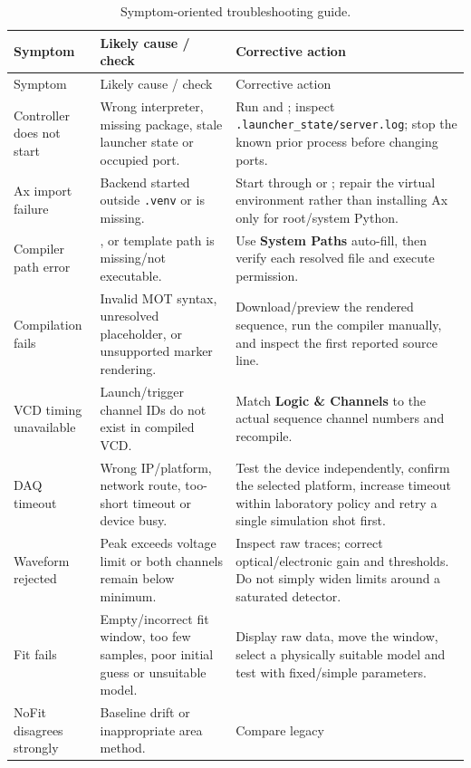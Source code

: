 \documentclass[11pt,oneside,openany]{book}
\newcommand{\code}[1]{\texttt{\detokenize{#1}}}
\newcommand{\ui}[1]{\textbf{#1}}
\newcommand{\pathcode}[1]{\nolinkurl{#1}}
\begin{document}
\small
\begin{longtable}{p{} p{} p{}}
\caption{Symptom-oriented troubleshooting guide.}\label{tab:trouble}\\
\toprule
Symptom & Likely cause / check & Corrective action\\
\midrule
\endfirsthead
\toprule Symptom & Likely cause / check & Corrective action\\ \midrule
\endhead
Controller does not start & Wrong interpreter, missing package, stale launcher state or
occupied port. & Run \code{--check-only} and \code{--status}; inspect
\pathcode{.launcher_state/server.log}; stop the known prior process before changing ports.\\
Ax import failure & Backend started outside \pathcode{.venv} or \code{ax-platform} is
missing. & Start through \code{launch_code} or \code{start_controller.sh}; repair the
virtual environment rather than installing Ax only for root/system Python.\\
Compiler path error & \code{tmot4}, \code{cmot4} or template path is missing/not
executable. & Use \ui{System Paths} auto-fill, then verify each resolved file and execute
permission.\\
Compilation fails & Invalid MOT syntax, unresolved placeholder, or unsupported marker
rendering. & Download/preview the rendered sequence, run the compiler manually, and inspect
the first reported source line.\\
VCD timing unavailable & Launch/trigger channel IDs do not exist in compiled VCD. & Match
\ui{Logic \& Channels} to the actual sequence channel numbers and recompile.\\
DAQ timeout & Wrong IP/platform, network route, too-short timeout or device busy. & Test the
device independently, confirm the selected platform, increase timeout within laboratory
policy and retry a single simulation shot first.\\
Waveform rejected & Peak exceeds voltage limit or both channels remain below minimum. &
Inspect raw traces; correct optical/electronic gain and thresholds. Do not simply widen
limits around a saturated detector.\\
Fit fails & Empty/incorrect fit window, too few samples, poor initial guess or unsuitable
model. & Display raw data, move the window, select a physically suitable model and test
with fixed/simple parameters.\\
NoFit disagrees strongly & Baseline drift or inappropriate area method. & Compare legacy

\end{longtable}
\end{document}
